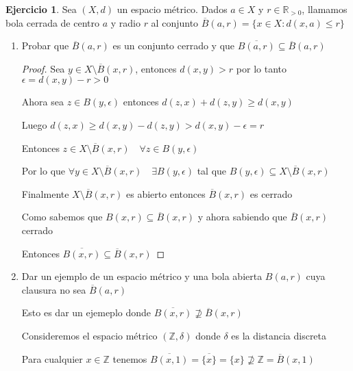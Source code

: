 \documentclass[11pt]{report}
\newcommand{\R}{\mathbb{R}}
\newcommand{\Z}{\mathbb{Z}}
\newcommand{\ol}{\overline}
\theoremstyle{definition}
\newtheorem{ej}{Ejercicio}
\begin{document}
\begin{ej}
Sea $(X,d)$ un espacio métrico. Dados $a \in X$ y $r \in \R_{>0}$, llamamos bola cerrada de centro $a$ y radio $r$ al conjunto $\ol{B}(a,r) = \{x \in X : d(x,a) \leq r\}$
\begin{enumerate}
  \item Probar que $\ol{B}(a,r)$ es un conjunto cerrado y que $\ol{B(a,r)} \subseteq \ol{B}(a,r)$
    \begin{proof}
      Sea $y \in X \setminus \ol{B}(x,r)$, entonces $d(x,y) > r$ por lo tanto $\epsilon = d(x,y) -r > 0$

      Ahora sea $z \in B(y,\epsilon)$ entonces $d(z,x) + d(z,y) \geq d(x,y)$

      Luego $d(z,x) \geq d(x,y) - d(z,y) > d(x,y) - \epsilon = r $

      Entonces $z \in X \setminus \ol{B}(x,r) \quad \forall z \in B(y,\epsilon)$

      Por lo que $\forall y \in X \setminus \ol{B}(x,r) \quad \exists B(y,\epsilon) $ tal que $ B(y,\epsilon) \subseteq X \setminus \ol{B}(x,r)$

      Finalmente $X \setminus \ol{B}(x,r)$ es abierto entonces $\ol{B}(x,r)$ es cerrado

      Como sabemos que $B(x,r)\subseteq \ol{B}(x,r)$ y ahora sabiendo que $\ol{B}(x,r)$ cerrado

      Entonces $\ol{B(x,r)} \subseteq \ol{B}(x,r)$
    \end{proof}
  \item Dar un ejemplo de un espacio métrico y una bola abierta $B(a,r)$ cuya clausura no sea $\ol{B}(a,r)$

    Esto es dar un ejemeplo donde $\ol{B(x,r)} \not\supseteq \ol{B}(x,r)$

    Consideremos el espacio métrico $(\Z,\delta)$ donde $\delta$ es la distancia discreta 

    Para cualquier $x \in \Z$ tenemos $\ol{B(x,1)} = \ol{\{x\}} = \{x\}\not\supseteq \Z = \ol{B}(x,1)$
\end{enumerate}
\end{ej}
\end{document}
